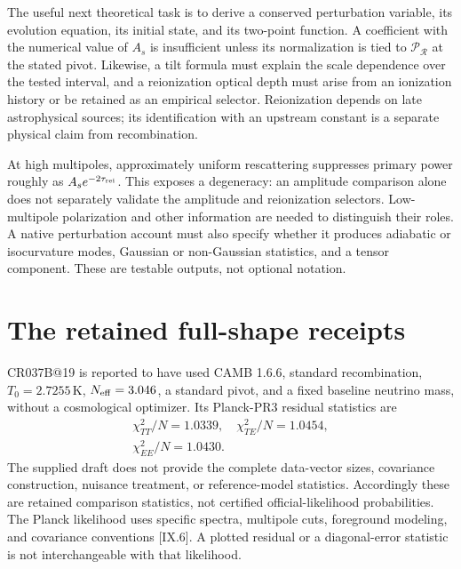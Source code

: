 The useful next theoretical task is to derive a conserved perturbation variable, its evolution equation, its initial state, and its two-point function. A coefficient with the numerical value of $A_s$ is insufficient unless its normalization is tied to $\mathcal P_{\mathcal R}$ at the stated pivot. Likewise, a tilt formula must explain the scale dependence over the tested interval, and a reionization optical depth must arise from an ionization history or be retained as an empirical selector. Reionization depends on late astrophysical sources; its identification with an upstream constant is a separate physical claim from recombination.

At high multipoles, approximately uniform rescattering suppresses primary power roughly as $A_se^{-2\tau_{\rm rei}}$. This exposes a degeneracy: an amplitude comparison alone does not separately validate the amplitude and reionization selectors. Low-multipole polarization and other information are needed to distinguish their roles. A native perturbation account must also specify whether it produces adiabatic or isocurvature modes, Gaussian or non-Gaussian statistics, and a tensor component. These are testable outputs, not optional notation.

\section{The retained full-shape receipts}

CR037B@19 is reported to have used CAMB 1.6.6, standard recombination, $T_0=2.7255\,\mathrm K$, $N_{\rm eff}=3.046$, a standard pivot, and a fixed baseline neutrino mass, without a cosmological optimizer. Its Planck-PR3 residual statistics are
\begin{equation}
 \begin{gathered}
 \chi^2_{TT}/N=1.0339,\quad \chi^2_{TE}/N=1.0454,\\
 \chi^2_{EE}/N=1.0430.
 \end{gathered}
 \label{c9:planckreceipt}
\end{equation}
The supplied draft does not provide the complete data-vector sizes, covariance construction, nuisance treatment, or reference-model statistics. Accordingly these are retained comparison statistics, not certified official-likelihood probabilities. The Planck likelihood uses specific spectra, multipole cuts, foreground modeling, and covariance conventions [IX.6]. A plotted residual or a diagonal-error statistic is not interchangeable with that likelihood.


